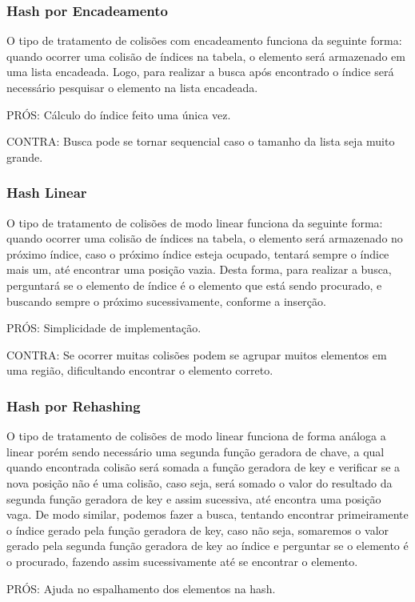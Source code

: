 \documentclass[
	11pt,				%
	oneside,			%
	a4paper,			%
	english,			%
	brazil,				%
	]{article}
\begin{document}
\subsubsection{Hash por Encadeamento}
 O tipo de tratamento de colisões com encadeamento funciona da seguinte forma: quando ocorrer uma colisão de índices na tabela, o elemento será armazenado em uma lista encadeada. Logo, para realizar a busca após encontrado o índice será necessário pesquisar o elemento na lista encadeada.
 
PRÓS: Cálculo do índice feito uma única vez.

CONTRA: Busca pode se tornar sequencial caso o tamanho da lista seja muito grande.

\subsubsection{Hash Linear}
O tipo de tratamento de colisões de modo linear funciona da seguinte forma: quando ocorrer uma colisão de índices na tabela, o elemento será armazenado no próximo índice, caso o próximo índice esteja ocupado, tentará sempre o índice mais um, até encontrar uma posição vazia. Desta forma, para realizar a busca, perguntará se o elemento de índice é o elemento que está sendo procurado, e buscando sempre o próximo sucessivamente, conforme a inserção.

PRÓS: Simplicidade de implementação.

CONTRA: Se ocorrer muitas colisões podem se agrupar muitos elementos em uma região, dificultando encontrar o elemento correto.

\subsubsection{Hash por Rehashing}
O tipo de tratamento de colisões de modo linear funciona de forma análoga a linear porém sendo necessário uma segunda função geradora de chave, a qual quando encontrada colisão será somada a função geradora de key e verificar se a nova posição não é uma colisão, caso seja, será somado o valor do resultado da segunda função geradora de key e assim sucessiva, até encontra uma posição vaga. De modo similar, podemos fazer a busca, tentando encontrar primeiramente o índice gerado pela função geradora de key, caso não seja, somaremos o valor gerado pela segunda função geradora de key ao índice e perguntar se o elemento é o procurado, fazendo assim sucessivamente até se encontrar o elemento.

PRÓS: Ajuda no espalhamento dos elementos na hash.
\end{document}
